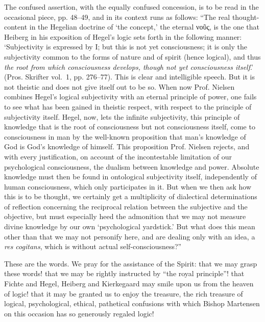 \documentclass[12pt]{book}
\newcommand{\opage}[1]{\marginnote{\footnotesize\textit{[#1]}}}
\begin{document}
The confused assertion, with the equally confused concession, is to be read in the occasional piece, pp. 48--49, and in its context runs as follows: ``The real thought-content in the Hegelian doctrine of `the concept,' the eternal νοῦς, is the one that Heiberg in his exposition of Hegel's logic sets forth in the following manner: `Subjectivity is expressed by I; but this is not yet consciousness; it is only the subjectivity common to the forms of nature and of spirit (hence logical), and thus \emph{the root from which consciousness develops, though not yet consciousness itself}.' (Pros. Skrifter vol.~1, pp. 276--77). This is clear and intelligible speech. But it is not theistic and does not give itself out to be so. When now Prof. Nielsen combines Hegel's logical subjectivity with an eternal principle of power, one fails to see what has been gained in theistic respect, with respect to the principle of subjectivity itself. Hegel, now, lets the infinite subjectivity, this principle of knowledge that is the root of consciousness but not consciousness itself, come to consciousness in man by the well-known proposition that man's knowledge of God is God's knowledge of himself. This proposition Prof. Nielsen rejects, and with every justification, on account of the incontestable limitation of our psychological consciousness, the dualism between knowledge and power. Absolute knowledge must then be found in ontological subjectivity itself, independently of human consciousness, which only participates in it. But when we then ask how this is to be thought, we certainly get a multiplicity of dialectical determinations of reflection concerning the reciprocal relation between the subjective and the objective, but must especially heed the admonition that we may not measure divine knowledge by our own `psychological yardstick.' But what does this mean other than that we may not personify here,
\opage{121}\setcounter{footnote}{0}%
and are dealing only with an idea, a \textit{res cogitans}, which is without actual self-consciousness?''

These are the words. We pray for the assistance of the Spirit: that we may grasp these words! that we may be rightly instructed by ``the royal principle''! that Fichte and Hegel, Heiberg and Kierkegaard may smile upon us from the heaven of logic! that it may be granted us to enjoy the treasure, the rich treasure of logical, psychological, ethical, pathetical confusions with which Bishop Martensen on this occasion has so generously regaled logic!
\end{document}
